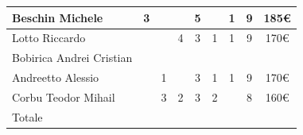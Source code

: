 \begin{itemize}
\begin{longtable}{|p{}|c|c|c|c|c|c|c|c|}
                \hline
                Beschin Michele & 3& & & 5& & 1& 9& 185€\\
                \hline
                Lotto \newline Riccardo & & & 4& 3& 1& 1& 9& 170€\\
                \hline
                Bobirica Andrei Cristian & & & & & & & & \\
                \hline
                Andreetto Alessio & & 1& & 3& 1& 1& 9& 170€\\
                \hline
                Corbu Teodor Mihail & & 3& 2& 3& 2& & 8& 160€\\
                \hline
                Totale & & & & & & & & \\
                \hline
            \end{longtable}
            \end{itemize}